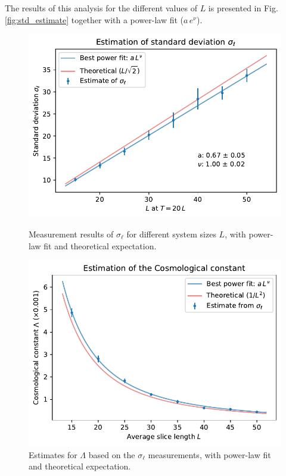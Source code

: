 The results of this analysis for the different values of $L$ is presented in Fig. \ref{fig:std_estimate} together with a power-law fit ($a \, e^{\nu}$).
\begin{figure}[ht]
    \begin{minipage}[t]{0.49\linewidth}
        \centering
        \includegraphics[width=\linewidth]{img/std_estimate.pdf}
        \caption{Measurement results of $\sigma_\ell$ for different system sizes $L$, with power-law fit and theoretical expectation.}
        \label{fig:std_estimate}
    \end{minipage}
    \hfill
    \begin{minipage}[t]{0.49\linewidth}
        \centering
        \includegraphics[width=\linewidth]{img/Lambda_estimate.pdf}
        \caption{Estimates for $\Lambda$ based on the $\sigma_\ell$ measurements, with power-law fit and theoretical expectation.}
        \label{fig:Lambda_estimate}
    \end{minipage}
\end{figure}
